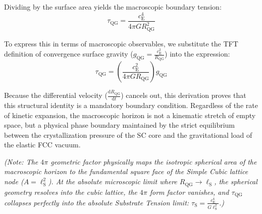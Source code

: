 Dividing by the surface area yields the macroscopic boundary tension:
\begin{equation}
    \tau_{\mathrm{QG}} = \frac{c_{\mathrm{E}}^4}{4\pi G R_{\mathrm{QG}}^2}
\end{equation}

To express this in terms of macroscopic observables, we substitute the TFT definition of convergence surface gravity ($g_{\mathrm{QG}} = \frac{c_{\mathrm{E}}^2}{R_{\mathrm{QG}}}$) into the expression:
\begin{equation}
    \tau_{\mathrm{QG}} = \left(\frac{c_{\mathrm{E}}^2}{4\pi G R_{\mathrm{QG}}}\right) g_{\mathrm{QG}}
\end{equation}

Because the differential velocity ($\frac{\mathrm{d}R_{\mathrm{QG}}}{\mathrm{d}t}$) cancels out, this derivation proves that this structural identity is a mandatory boundary condition. Regardless of the rate of kinetic expansion, the macroscopic horizon is not a kinematic stretch of empty space, but a physical phase boundary maintained by the strict equilibrium between the crystallization pressure of the SC core and the gravitational load of the elastic FCC vacuum.

\vspace{0.5em}
\noindent\textit{(Note: The $4\pi$ geometric factor physically maps the isotropic spherical area of the macroscopic horizon to the fundamental square face of the Simple Cubic lattice node ($A = \ell_{\mathrm{S}}^2$). At the absolute microscopic limit where $R_{\mathrm{QG}} \to \ell_{\mathrm{S}}$, the spherical geometry resolves into the cubic lattice, the $4\pi$ form factor vanishes, and $\tau_{\mathrm{QG}}$ collapses perfectly into the absolute Substrate Tension limit: $\tau_{\mathrm{S}} = \frac{c_{\mathrm{E}}^4}{G\ell_{\mathrm{S}}^2}$.)}

